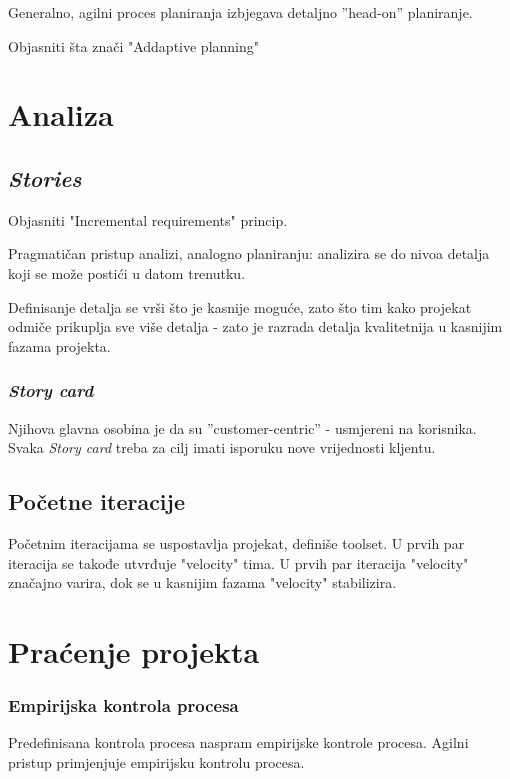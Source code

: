 \documentclass[lmodern, utf8, zavrsni]{fit}
\begin{document}
Generalno, agilni proces planiranja izbjegava detaljno ''head-on'' planiranje.

Objasniti šta znači "Addaptive planning"

\chapter{Analiza}

\section{\emph{Stories}}

Objasniti "Incremental requirements" princip.

Pragmatičan pristup analizi, analogno planiranju: analizira se do nivoa detalja koji se može postići u datom trenutku.

Definisanje detalja se vrši što je kasnije moguće, zato što tim kako projekat odmiče prikuplja sve više detalja - zato je razrada detalja kvalitetnija u kasnijim fazama projekta.

\subsection{\emph{Story card}}

Njihova glavna osobina je da su ''customer-centric'' - usmjereni na korisnika.  Svaka \emph{Story card} treba za cilj imati isporuku nove vrijednosti kljentu.

\section{Početne iteracije}

Početnim iteracijama se uspostavlja projekat, definiše toolset. U prvih par iteracija se takođe utvrđuje "velocity" tima.
U prvih par iteracija "velocity" značajno varira, dok se u kasnijim fazama "velocity" stabilizira.


\chapter{Praćenje projekta}
\vspace*{-0.7cm}

\subsection{Empirijska kontrola procesa}

Predefinisana kontrola procesa naspram empirijske kontrole procesa\citep{agiletransition}. Agilni pristup primjenjuje empirijsku kontrolu procesa.
\end{document}
